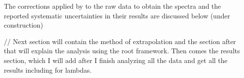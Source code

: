 The corrections applied by \citet{PhysRevC.96.044904} to the raw data to obtain the spectra and the reported systematic uncertainties in their results are discussed below (under construction)

// Next section will contain the method of extrapolation and the section after that will explain the analysis using the root framework. Then comes the results section, which I will add after I finish analyzing all the data and get all the results including for lambdas.









